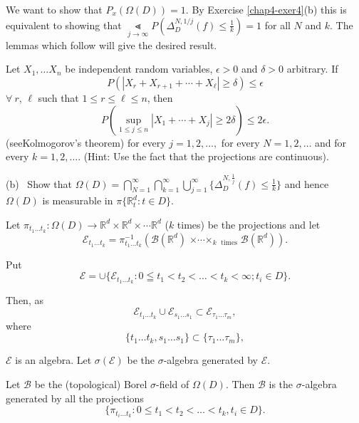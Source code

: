 \setcounter{step}{2}
\begin{step}%
We want to show that $P_{x}(\Omega(D))=1$. By Exercise
\ref{chap4-exer4}(b) this is equivalent to showing that
$\Lt\limits_{j\to \infty}P(\Delta^{N,1/j}_{D}(f)\leq \frac{1}{k})=1$
for all $N$ and $k$. The lemmas which follow will give the desired result.
\end{step}


\begin{lemma*}[(L\'evy)]
Let $X_{1},\ldots X_{n}$ be independent random variables, $\epsilon>0$
and $\delta>0$ arbitrary. If
$$
P(|X_{r}+X_{r+1}+\cdots+X_{\ell}|\geq \delta)\leq \epsilon
$$
$\forall\ r$, $\ell$ such that $1\leq r\leq \ell\leq n$, then
{\fontsize{10pt}{12pt}\selectfont
$$
P(\sup\limits_{1\leq j\leq n}|X_{1}+\cdots+X_{j}|\geq 2\delta)\leq
2\epsilon.
$$}
(see\pageoriginale Kolmogorov's theorem) for every $j=1,2,\ldots,$ for
every $N=1,2,\ldots$ and for every $k=1,2,\ldots$. (Hint: Use the fact
that the projections are continuous).

\smallskip
{\rm (b)}~ Show that
$\Omega(D)=\bigcap\limits^{\infty}_{N=1}\bigcap\limits^{\infty}_{k=1}\bigcup\limits^{\infty}_{j=1}\{\Delta^{N,\frac{1}{j}}_{D}(f)\leq
\frac{1}{k}\}$ and hence $\Omega(D)$ is measurable in
$\pi\{\mathbb{R}^{d}_{t}:t\in D\}$.
\end{lemma*}

Let $\pi_{t_{1}\ldots t_{k}}:\Omega(D)\to \mathbb{R}^{d}\times
\mathbb{R}^{d}\times\cdots\mathbb{R}^{d}$ ($k$ times) be the
projections and let
$$
\mathscr{E}_{t_{1}\ldots t_{k}}=\pi^{-1}_{t_{1}\ldots
  t_{k}}(\mathscr{B}(\mathbb{R}^{d})
{\displaystyle{\mathop{\times\cdots\times}_{k\text{~ times}}}}
\mathscr{B}(\mathbb{R}^{d})).
$$

Put
$$
\mathscr{E}=\cup \{\mathscr{E}_{t_{1}\ldots t_{k}}:0\leqq
t_{1}<t_{2}<\ldots <t_{k}<\infty; t_{i}\in D\}.
$$

Then, as
$$
\mathscr{E}_{t_{1}\ldots t_{k}}\cup \mathscr{E}_{s_{1}\ldots
  s_{1}}\subset \mathscr{E}_{\tau_{1}\ldots \tau_{m}},
$$
where
$$
\{t_{1}\ldots t_{k},s_{1}\ldots s_{1}\}\subset \{\tau_{1}\ldots
\tau_{m}\},
$$

$\mathscr{E}$ is an algebra. Let $\sigma(\mathscr{E})$ be the
$\sigma$-algebra generated by $\mathscr{E}$.

\begin{lemma*}
Let $\mathscr{B}$ be the (topological) Borel $\sigma$-field of
$\Omega(D)$. Then $\mathscr{B}$ is the $\sigma$-algebra generated by
all the projections
$$
\{\pi_{t_{i}\ldots t_{k}}:0\leq t_{1}<t_{2}<\ldots<t_{k},t_{i}\in D\}.
$$
\end{lemma*}

